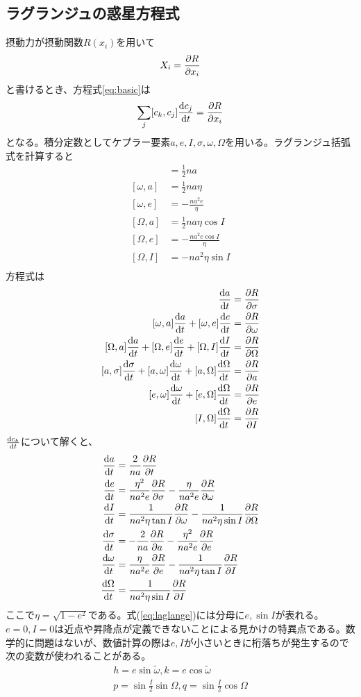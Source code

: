 	\subsection{ラグランジュの惑星方程式}
		摂動力が摂動関数$R(x_i)$を用いて
			\[X_i = \pd[R]{x_i}\]
		と書けるとき、方程式\ref{eq:basic}は
			\[\sum_{j} [c_k, c_j]\de[c_j]{t} = \pd[R]{x_i}\]
		となる。積分定数としてケプラー要素$a, e, I, \sigma, \omega, \Omega$を用いる。ラグランジュ括弧式を計算すると
		\begin{align*}
			[\sigma, a] &= \frac{1}{2}na\\
			[\omega, a] &= \frac{1}{2}na\eta\\
			[\omega, e] &= - \frac{na^2e}{\eta}\\
			[\Omega, a] &= \frac{1}{2}na\eta \cos I\\
			[\Omega, e] &= - \frac{na^2e\cos I}{\eta}\\
			[\Omega, I] &= - na^2\eta\sin I\\
		\end{align*}
		方程式は
		\begin{align*}
			[\sigma, a]\de[a]{t} = \pd[R]{\sigma}\\
			[\omega, a]\de[a]{t} + [\omega, e]\de[e]{t} = \pd[R]{\omega}\\
			[\Omega, a]\de[a]{t} + [\Omega, e]\de[e]{t} + [\Omega, I]\de[I]{t} = \pd[R]{\Omega}\\
			[a, \sigma]\de[\sigma]{t} + [a, \omega]\de[\omega]{t} + [a, \Omega]\de[\Omega]{t} = \pd[R]{a}\\
			[e, \omega]\de[\omega]{t} + [e, \Omega]\de[\Omega]{t} = \pd[R]{e}\\
			[I, \Omega]\de[\Omega]{t} = \pd[R]{I}\\
		\end{align*}
		$\de[c_k]{t}$について解くと、
		\begin{align}
			\label{eq:laglange}
			\de[a]{t} &= \frac{2}{na}\pd[R]{t}\\
			\de[e]{t} &= \frac{\eta^2}{na^2e}\pd[R]{\sigma} - \frac{\eta}{na^2e}\pd[R]{\omega}\\
			\de[I]{t} &= \frac{1}{na^2\eta\tan I}\pd[R]{\omega} - \frac{1}{na^2\eta\sin I}\pd[R]{\Omega}\\
			\de[\sigma]{t} &= - \frac{2}{na}\pd[R]{a} - \frac{\eta^2}{na^2e}\pd[R]{e}\\
			\de[\omega]{t} &= \frac{\eta}{na^2e}\pd[R]{e} - \frac{1}{na^2\eta\tan I}\pd[R]{I}\\
			\de[\Omega]{t} &= \frac{1}{na^2\eta\sin I}\pd[R]{I}
		\end{align}
		ここで$\eta = \sqrt{1 - e^2}$である。式(\ref{eq:laglange})には分母に$e, \sin I$が表れる。$e = 0, I = 0$は近点や昇降点が定義できないことによる見かけの特異点である。数学的に問題はないが、数値計算の際は$e, I$が小さいときに桁落ちが発生するので次の変数が使われることがある。
		\begin{gather*}
			h = e\sin\tilde{\omega}, k = e\cos\tilde{\omega}\\
			p = \sin\frac{I}{2}\sin\Omega, q = \sin\frac{I}{2}\cos\Omega\\
		\end{gather*}

